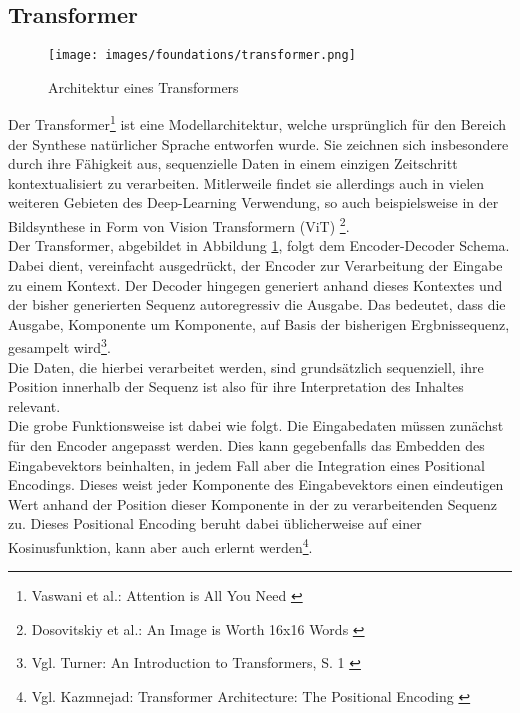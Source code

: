\subsection{Transformer}

\begin{figure}[ht]
    \centering
    \texttt{[image: images/foundations/transformer.png]} 
    \caption{Architektur eines Transformers \cite{vaswani2023attentionneed}}
    \label{fig:transformer}
\end{figure}
Der Transformer\footnote{
    Vaswani et al.: Attention is All You Need
    \cite{vaswani2023attentionneed}
} ist eine Modellarchitektur, welche ursprünglich für den Bereich der Synthese natürlicher Sprache entworfen wurde. Sie zeichnen sich insbesondere durch ihre Fähigkeit aus, sequenzielle Daten in einem einzigen Zeitschritt kontextualisiert zu verarbeiten. Mitlerweile findet sie allerdings auch in vielen weiteren Gebieten des Deep-Learning Verwendung, so auch beispielsweise in der Bildsynthese in Form von Vision Transformern (ViT) \footnote{
    Dosovitskiy et al.: An Image is Worth 16x16 Words 
    \cite{dosovitskiy2021imageworth16x16words}
}. \\ 
Der Transformer, abgebildet in Abbildung \ref{fig:transformer}, folgt dem Encoder-Decoder Schema. Dabei dient, vereinfacht ausgedrückt, der Encoder zur Verarbeitung der Eingabe zu einem Kontext. Der Decoder hingegen generiert anhand dieses Kontextes und der bisher generierten Sequenz autoregressiv die Ausgabe. Das bedeutet, dass die Ausgabe, Komponente um Komponente, auf Basis der bisherigen Ergbnissequenz, gesampelt wird\footnote{
    Vgl. Turner: An Introduction to Transformers, S. 1
    \cite{turner2024introductiontransformers}
}. \\ 
Die Daten, die hierbei verarbeitet werden, sind grundsätzlich sequenziell, ihre Position innerhalb der Sequenz ist also für ihre Interpretation des Inhaltes relevant. \\
Die grobe Funktionsweise ist dabei wie folgt. Die Eingabedaten müssen zunächst für den Encoder angepasst werden. Dies kann gegebenfalls das Embedden des Eingabevektors beinhalten, in jedem Fall aber die Integration eines Positional Encodings. Dieses weist jeder Komponente des Eingabevektors einen eindeutigen Wert anhand der Position dieser Komponente in der zu verarbeitenden Sequenz zu. Dieses Positional Encoding beruht dabei üblicherweise auf einer Kosinusfunktion, kann aber auch erlernt werden\footnote{
    Vgl. Kazmnejad: Transformer Architecture: The Positional Encoding
    \cite{kazemnejad2019:pencoding}
}. \\
